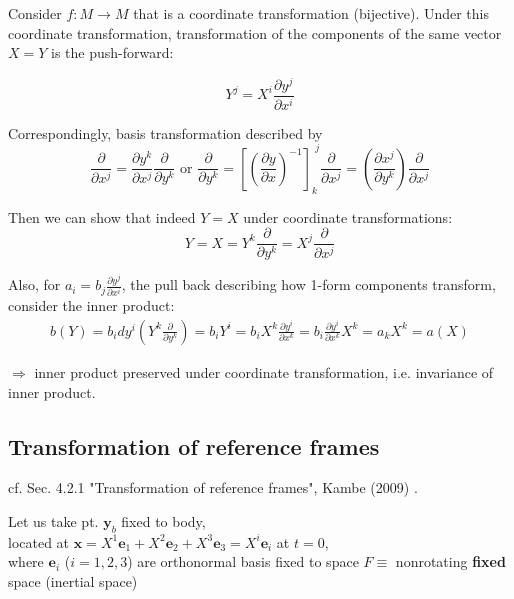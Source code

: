 \documentclass[10pt]{amsart}
\begin{document}
\begin{multicols*}{2}
Consider $f: M \to M$ that is a coordinate transformation (bijective). Under this coordinate transformation, transformation of the components of the same vector $X = Y$ is the push-forward:

\begin{equation}
	Y^j = X^i \frac{\partial y^j}{\partial x^i}
\end{equation}

Correspondingly, basis transformation described by 
\begin{equation}
	\frac{\partial }{ \partial x^j }= \frac{\partial y^k }{ \partial x^j} \frac{ \partial }{ \partial y^k}  \text{ or  } \frac{\partial }{\partial y^k} = \left[  \left( \frac{\partial y}{ \partial x} \right)^{-1} \right]_k^{\, \, j} \frac{ \partial }{ \partial x^j } = \left( \frac{ \partial x^j}{ \partial y^k} \right) \frac{ \partial }{ \partial x^j}
\end{equation} 

Then we can show that indeed $Y = X$ under coordinate transformations:
\begin{equation}
	Y = X = Y^k \frac{\partial }{\partial y^k} = X^j \frac{ \partial }{ \partial x^j}
\end{equation}

Also, for $a_i = b_j \frac{ \partial y^j}{\partial x^i}$, the pull back describing how 1-form components transform, consider the inner product:
\begin{equation}
\begin{gathered}
	b(Y) = b_i dy^i \left( Y^k \frac{\partial }{ \partial y^k} \right) = b_i Y^i = b_i X^k \frac{\partial y^i}{\partial x^k} = b_i \frac{\partial y^i }{\partial x^k} X^k = a_k X^k = a(X)
\end{gathered}
\end{equation}

$\Longrightarrow$ inner product preserved under coordinate transformation, i.e. invariance of inner product.





\subsection{Transformation of reference frames}

cf. Sec. 4.2.1 "Transformation of reference frames", Kambe (2009) \cite{TKambe2009}.

Let us take pt. $\mathbf{y}_b$ fixed to body, \\
located at $\mathbf{x} = X^1 \mathbf{e}_1 + X^2 \mathbf{e}_2 + X^3 \mathbf{e}_3 = X^i \mathbf{e}_i$ at $t=0$, \\
where $\mathbf{e}_i$ ($i=1,2,3$) are orthonormal basis fixed to space $F \equiv$ nonrotating \textbf{fixed} space (inertial space) \\


\end{multicols*}
\end{document}
